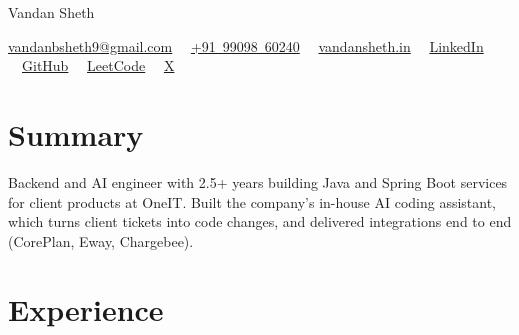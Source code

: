 \documentclass[10pt, letterpaper]{article}
\begin{document}
    \begin{center}
        {\fontsize{22 pt}{22 pt}\selectfont Vandan Sheth}

        \vspace{5 pt}
        \mbox{\href{mailto:vandanbsheth9@gmail.com}{vandanbsheth9@gmail.com}}
        \ \textbar\ \mbox{\href{tel:+919909860240}{+91 99098 60240}}
        \ \textbar\ \mbox{\href{https://www.vandansheth.in/}{vandansheth.in}}
        \ \textbar\ \mbox{\href{https://www.linkedin.com/in/vandan-sheth08/}{LinkedIn}}
        \ \textbar\ \mbox{\href{https://github.com/vandan08}{GitHub}}
        \ \textbar\ \mbox{\href{https://leetcode.com/u/vandan08/}{LeetCode}}
        \ \textbar\ \mbox{\href{https://x.com/vandans08}{X}}
    \end{center}

    \section{Summary}

    Backend and AI engineer with 2.5+ years building Java and Spring Boot services for client products at
    OneIT. Built the company's in-house AI coding assistant, which turns client tickets into code changes,
    and delivered integrations end to end (CorePlan, Eway, Chargebee).

    \section{Experience}
\end{document}
